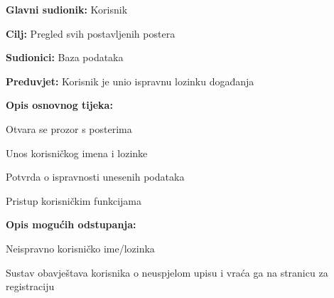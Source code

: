 					\noindent {}
					\begin{packed_item}
						
						\item \textbf{Glavni sudionik: } Korisnik
						\item  \textbf{Cilj:} Pregled svih postavljenih postera
						\item  \textbf{Sudionici:} Baza podataka
						\item  \textbf{Preduvjet:} Korisnik je unio ispravnu lozinku događanja
						\item  \textbf{Opis osnovnog tijeka:}
						
						\item[] \begin{packed_enum}
							
							\item Otvara se prozor s posterima
							\item Unos korisničkog imena i lozinke
							\item Potvrda o ispravnosti unesenih podataka
							\item Pristup korisničkim funkcijama
							
						\end{packed_enum}
						
						\item  \textbf{Opis mogućih odstupanja:}
						
						\item[] \begin{packed_item}
							
							\item[2.a] Neispravno korisničko ime/lozinka
							\item[] \begin{packed_enum}
								
								\item Sustav obavještava korisnika o neuspjelom upisu i vraća ga na stranicu za registraciju
								
							\end{packed_enum}
							
							
						\end{packed_item}
					\end{packed_item}	
					
